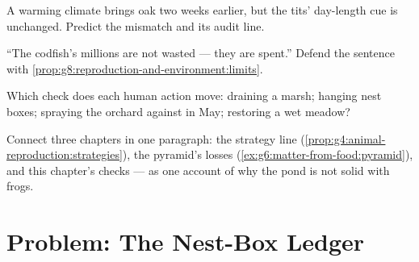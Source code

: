 \begin{exercise}[$\star\star$]\label{exo:g8:reproduction-and-environment:9}
A warming climate brings oak  two weeks
earlier, but the tits' day-length cue is unchanged.
Predict the mismatch and its audit line.
\end{exercise}

\begin{exercise}[$\star\star$]\label{exo:g8:reproduction-and-environment:10}
``The codfish's millions are not wasted --- they are
spent.'' Defend the sentence with
\cref{prop:g8:reproduction-and-environment:limits}.
\end{exercise}

\begin{exercise}[$\star\star$]\label{exo:g8:reproduction-and-environment:11}
Which check does each human action move: draining a
marsh; hanging nest boxes; spraying the orchard against
 in May; restoring a wet meadow?
\end{exercise}

\begin{exercise}[$\star\star\star$]\label{exo:g8:reproduction-and-environment:12}
Connect three chapters in one paragraph: the strategy
line (\cref{prop:g4:animal-reproduction:strategies}), the
pyramid's losses (\cref{ex:g6:matter-from-food:pyramid}),
and this chapter's checks --- as one account of why the
pond is not solid with frogs.
\end{exercise}

\section{Problem: The Nest-Box Ledger}

